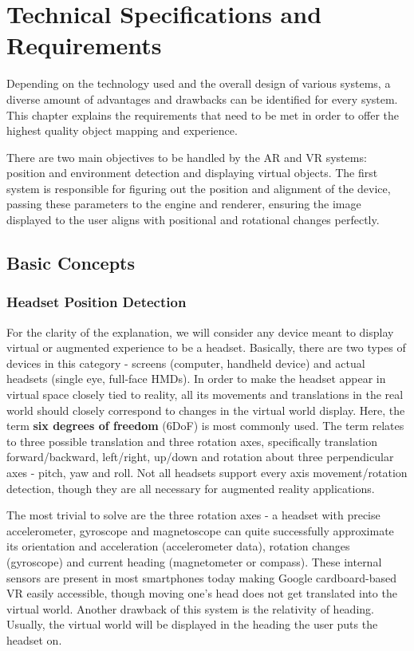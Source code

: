 \documentclass[12pt, a4paper]{article}
\begin{document}
\section{Technical Specifications and Requirements}
Depending on the technology used and the overall design of various systems, a diverse amount of advantages and drawbacks can be identified for every system. This chapter explains the requirements that need to be met in order to offer the highest quality object mapping and experience. 

There are two main objectives to be handled by the AR and VR systems: position and environment detection and displaying virtual objects. The first system is responsible for figuring out the position and alignment of the device, passing these parameters to the engine and renderer, ensuring the image displayed to the user aligns with positional and rotational changes perfectly.

\subsection{Basic Concepts}
\subsubsection{Headset Position Detection}
For the clarity of the explanation, we will consider any device meant to display virtual or augmented experience to be a headset. Basically, there are two types of devices in this category - screens (computer, handheld device) and actual headsets (single eye, full-face HMDs). In order to make the headset appear in virtual space closely tied to reality, all its movements and translations in the real world should closely correspond to changes in the virtual world display. Here, the term \textbf{six degrees of freedom} (6DoF) is most commonly used. The term relates to three possible translation and three rotation axes, specifically translation forward/backward, left/right, up/down and rotation about three perpendicular axes - pitch, yaw and roll. Not all headsets support every axis movement/rotation detection, though they are all necessary for augmented reality applications.

The most trivial to solve are the three rotation axes - a headset with precise accelerometer, gyroscope and magnetoscope can quite successfully approximate its orientation and acceleration (accelerometer data), rotation changes (gyroscope) and current heading (magnetometer or compass). These internal sensors are present in most smartphones today making Google cardboard-based VR easily accessible, though moving one’s head does not get translated into the virtual world. Another drawback of this system is the relativity of heading. Usually, the virtual world will be displayed in the heading the user puts the headset on.
\end{document}

